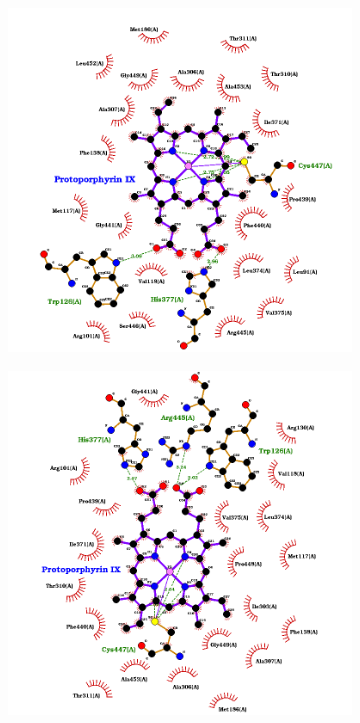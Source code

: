 \documentclass[12pt]{article}
\begin{document}
	\FloatBarrier
	\begin{figure}[h!]
		\centering
		\begin{subfigure}[h!]{0.35\textwidth}
			\hspace{2cm}
			\includegraphics[width=\textwidth]{../2/Dock/best.png}
			\caption{}
		\end{subfigure}
		\hfill
		\begin{subfigure}[h!]{0.35\textwidth}
			\hspace{-2cm}
			\includegraphics[width=\textwidth]{../2/Dock/best2.png}

\end{subfigure}
\end{figure}
\end{document}
